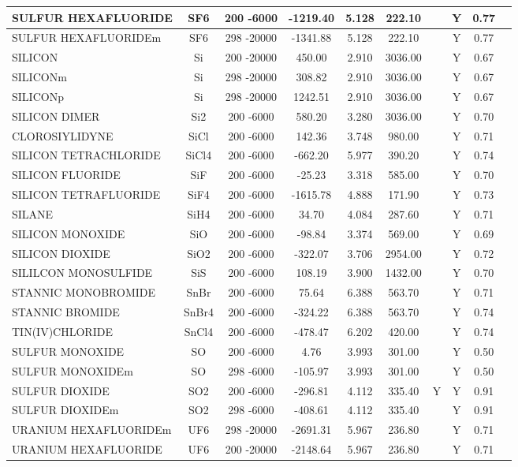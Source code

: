 \begin{longtable}{@{\extracolsep{\fill}}|l|c|c|c|c|c|c|c|c|l|}
SULFUR HEXAFLUORIDE&SF6&200 -6000&-1219.40& 5.128&   222.10& &Y& 0.77&\\ \hline
SULFUR HEXAFLUORIDEm&SF6&298 -20000&-1341.88& 5.128&   222.10& &Y& 0.77&\\ \hline
SILICON&Si&200 -20000&  450.00& 2.910&  3036.00& &Y& 0.67&\\ \hline
SILICONm&Si&298 -20000&  308.82& 2.910&  3036.00& &Y& 0.67&\\ \hline
SILICONp&Si&298 -20000& 1242.51& 2.910&  3036.00& &Y& 0.67&\\ \hline
SILICON DIMER&Si2&200 -6000&  580.20& 3.280&  3036.00& &Y& 0.70&\\ \hline
CLOROSIYLIDYNE&SiCl&200 -6000&  142.36& 3.748&   980.00& &Y& 0.71&\\ \hline
SILICON TETRACHLORIDE&SiCl4&200 -6000& -662.20& 5.977&   390.20& &Y& 0.74&\\ \hline
SILICON FLUORIDE&SiF&200 -6000&  -25.23& 3.318&   585.00& &Y& 0.70&\\ \hline
SILICON TETRAFLUORIDE&SiF4&200 -6000&-1615.78& 4.888&   171.90& &Y& 0.73&\\ \hline
SILANE&SiH4&200 -6000&   34.70& 4.084&   287.60& &Y& 0.71&\\ \hline
SILICON MONOXIDE&SiO&200 -6000&  -98.84& 3.374&   569.00& &Y& 0.69&\\ \hline
SILICON DIOXIDE&SiO2&200 -6000& -322.07& 3.706&  2954.00& &Y& 0.72&\\ \hline
SILILCON MONOSULFIDE&SiS&200 -6000&  108.19& 3.900&  1432.00& &Y& 0.70&\\ \hline
STANNIC MONOBROMIDE&SnBr&200 -6000&   75.64& 6.388&   563.70& &Y& 0.71&\\ \hline
STANNIC BROMIDE&SnBr4&200 -6000& -324.22& 6.388&   563.70& &Y& 0.74&\\ \hline
TIN(IV)CHLORIDE&SnCl4&200 -6000& -478.47& 6.202&   420.00& &Y& 0.74&\\ \hline
SULFUR MONOXIDE&SO&200 -6000&    4.76& 3.993&   301.00& &Y& 0.50&\\ \hline
SULFUR MONOXIDEm&SO&298 -6000& -105.97& 3.993&   301.00& &Y& 0.50&\\ \hline
SULFUR DIOXIDE&SO2&200 -6000& -296.81& 4.112&   335.40&Y&Y& 0.91&\\ \hline
SULFUR DIOXIDEm&SO2&298 -6000& -408.61& 4.112&   335.40& &Y& 0.91&\\ \hline
URANIUM HEXAFLUORIDEm&UF6&298 -20000&-2691.31& 5.967&   236.80& &Y& 0.71&\\ \hline
URANIUM HEXAFLUORIDE&UF6&200 -20000&-2148.64& 5.967&   236.80& &Y& 0.71&\\ \hline

\end{longtable}
